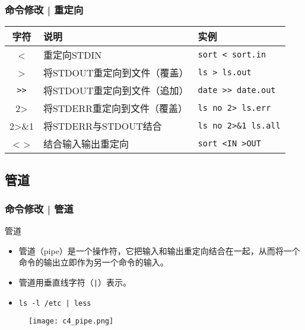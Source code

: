 \begin{frame}[fragile]
  \frametitle{命令修改 | \alert{重定向}}
  \begin{table}
    \centering
    \begin{tabular}{cll}
      \hline
      \rowcolor{blue!50}字符 & 说明 & 实例\\
      \hline
      < & 重定向STDIN & \verb|sort < sort.in|\\
      > & 将STDOUT重定向到文件（覆盖） & \verb|ls > ls.out|\\
      \verb|>>| & 将STDOUT重定向到文件（追加） & \verb|date >> date.out|\\
      2> & 将STDERR重定向到文件（覆盖） & \verb|ls no 2> ls.err|\\
      2>\&1 & 将STDERR与STDOUT结合 & \verb|ls no 2>&1 ls.all|\\
      < > & 结合输入输出重定向 & \verb|sort <IN >OUT|\\
      \hline
    \end{tabular}
  \end{table}
\end{frame}

\subsection{管道}
\begin{frame}[fragile]
  \frametitle{命令修改 | \alert{管道}}
  \begin{block}{管道}
    \begin{itemize}
      \item 管道（pipe）是一个操作符，它把输入和输出重定向结合在一起，从而将一个命令的输出立即作为另一个命令的输入。
      \item 管道用垂直线字符（\verb=|=）表示。
      \item \verb=ls -l /etc | less=
    \end{itemize}
  \end{block}
  \begin{figure}
    \centering
    \texttt{[image: c4\_pipe.png]}
  \end{figure}
\end{frame}

